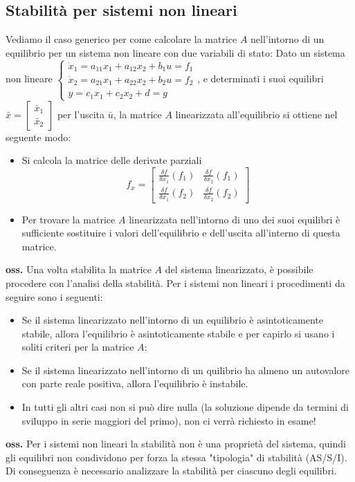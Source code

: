 \subsection{Stabilità per sistemi non lineari}
Vediamo il caso generico per come calcolare la matrice $A$ nell'intorno di un equilibrio per un sistema non lineare con due variabili di stato:\newline
\newline
Dato un sistema non lineare $\begin{cases}
    \dot{x}_1 = a_{11}x_1 + a_{12}x_2 + b_{1}u = f_1\\ 
    \dot{x}_2 = a_{21}x_1 + a_{22}x_2 +b_2u =f_2\\
    y = c_1x_1 + c_2x_2 + d = g
\end{cases}$, e determinati i suoi equilibri $\bar{x} = \left[\begin{matrix}
    \bar{x}_1\\\bar{x}_2
\end{matrix}\right]$ per l'uscita $\bar{u}$, la matrice $A$ linearizzata all'equilibrio si ottiene nel seguente modo:
\begin{itemize}
    \item Si calcola la matrice delle derivate parziali
    \[
        f_x=\left[\begin{matrix}
            \frac{\delta f}{\delta x_1} (f_1) & \frac{\delta f}{\delta x_2} (f_1)\\
            \frac{\delta f}{\delta x_1} (f_2) & \frac{\delta f}{\delta x_2} (f_2)
        \end{matrix}\right]
    \]
    \item Per trovare la matrice $A$ linearizzata nell'intorno di uno dei suoi equilibri è sufficiente sostituire i valori dell'equilibrio e dell'uscita all'interno di questa matrice.
\end{itemize}
\textbf{oss.} Una volta stabilita la matrice $A$ del sistema linearizzato, è possibile procedere con l'analisi della stabilità. Per i sistemi non lineari i procedimenti da seguire sono i seguenti:
\begin{itemize}
    \item Se il sistema linearizzato nell'intorno di un equilibrio è asintoticamente stabile, allora l'equilibrio è asintoticamente stabile e per capirlo si usano i soliti criteri per la matrice $A$;
    \item Se il sistema linearizzato nell'intorno di un quilibrio ha almeno un autovalore con parte reale positiva, allora l'equilibrio è instabile.
    \item In tutti gli altri casi non si può dire nulla (la soluzione dipende da termini di sviluppo in serie maggiori del primo), non ci verrà richiesto in esame!
\end{itemize}
\textbf{oss.} Per i sistemi non lineari la stabilità non è una proprietà del sistema, quindi gli equilibri non condividono per forza la stessa "tipologia" di stabilità (AS/S/I). Di conseguenza è necessario analizzare la stabilità per ciascuno degli equilibri.
